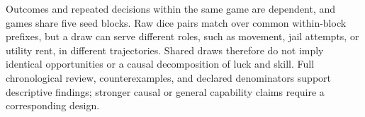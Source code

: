 Outcomes and repeated decisions within the same game are dependent, and games
share five seed blocks. Raw dice pairs match over common within-block prefixes,
but a draw can serve different roles, such as movement, jail attempts, or utility rent, in
different trajectories. Shared draws therefore do not imply identical
opportunities or a causal decomposition of luck and skill. Full chronological
review, counterexamples, and declared denominators support descriptive findings;
stronger causal or general capability claims require a corresponding design.
